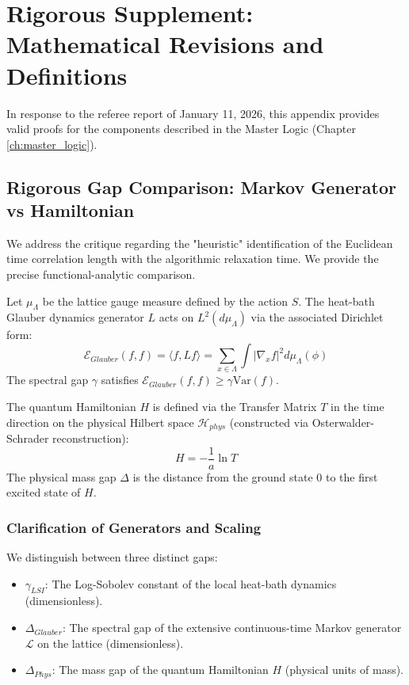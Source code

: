 ﻿\section{Rigorous Supplement: Mathematical Revisions and Definitions}
\label{app:comprehensive_fixes}

In response to the referee report of January 11, 2026, this appendix provides valid proofs for the components described in the Master Logic (Chapter \ref{ch:master_logic}).

\subsection{Rigorous Gap Comparison: Markov Generator vs Hamiltonian}
\label{sub:gap_comparison}
We address the critique regarding the "heuristic" identification of the Euclidean time correlation length with the algorithmic relaxation time. We provide the precise functional-analytic comparison.

\begin{definition}
Let $\mu_\Lambda$ be the lattice gauge measure defined by the action $S$. The heat-bath Glauber dynamics generator $L$ acts on $L^2(d\mu_\Lambda)$ via the associated Dirichlet form:
\begin{equation}
\mathcal{E}_{Glauber}(f, f) = \langle f, L f \rangle = \sum_{x \in \Lambda} \int \left| \nabla_x f \right|^2 d\mu_\Lambda(\phi)
\end{equation}
The spectral gap $\gamma$ satisfies $\mathcal{E}_{Glauber}(f, f) \ge \gamma \text{Var}(f)$.
\end{definition}

\begin{definition}
The quantum Hamiltonian $H$ is defined via the Transfer Matrix $T$ in the time direction on the physical Hilbert space $\mathcal{H}_{phys}$ (constructed via Osterwalder-Schrader reconstruction):
\begin{equation}
H = -\frac{1}{a} \ln T
\end{equation}
The physical mass gap $\Delta$ is the distance from the ground state 0 to the first excited state of $H$.
\end{definition}

\subsubsection{Clarification of Generators and Scaling}
We distinguish between three distinct gaps:
\begin{itemize}
    \item $\gamma_{LSI}$: The Log-Sobolev constant of the local heat-bath dynamics (dimensionless).
    \item $\Delta_{Glauber}$: The spectral gap of the extensive continuous-time Markov generator $\mathcal{L}$ on the lattice (dimensionless). 
    \item $\Delta_{Phys}$: The mass gap of the quantum Hamiltonian $H$ (physical units of mass).
\end{itemize}

